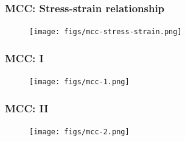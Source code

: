 \documentclass[notes]{beamer}
\begin{document}
\begin{frame}
\frametitle{MCC: Stress-strain relationship}
\begin{figure}
	\texttt{[image: figs/mcc-stress-strain.png]}
\end{figure}
\end{frame}

\begin{frame}
\frametitle{MCC: I}
\begin{figure}
	\texttt{[image: figs/mcc-1.png]}
\end{figure}
\end{frame}

\begin{frame}
\frametitle{MCC: II}
\begin{figure}
	\texttt{[image: figs/mcc-2.png]}
\end{figure}
\end{frame}
\end{document}
